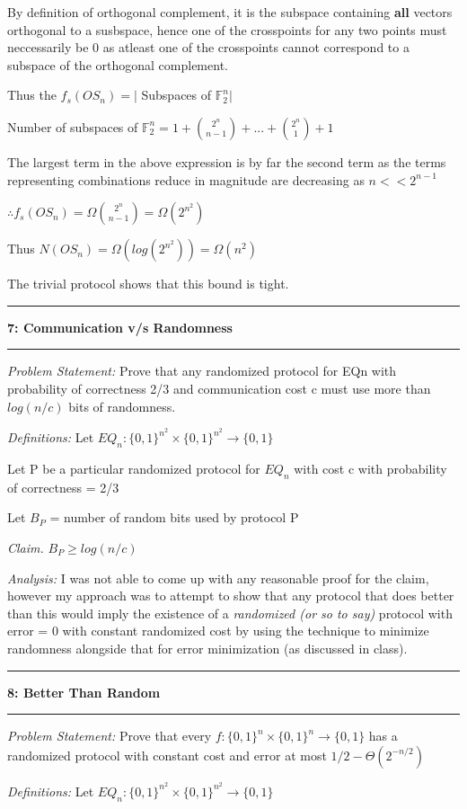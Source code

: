 \documentclass[11pt]{article}
\newcommand\question[2]{\vspace{.25in}\hrule\textbf{#1: #2}\vspace{.5em}\hrule\vspace{.10in}}
\newcommand\analysis{\vspace{.10in}\emph{Analysis: }\newline}
\newcommand\problem{\emph{Problem Statement:}\newline}
\newcommand\definitions{\emph{Definitions:}\newline}
\newcommand\claim{\emph{Claim.}\newline}
\begin{document}
By definition of orthogonal complement, it is the subspace containing \textbf{all} vectors orthogonal to a susbspace, hence one of the crosspoints for any two points must neccessarily be 0 as atleast one of the crosspoints cannot correspond to a subspace of the orthogonal complement. 

Thus the $f_s(OS_n) = \lvert$ Subspaces of $\mathbb{F}_2^n \rvert$

Number of subspaces of $\mathbb{F}_2^n = 1 + {2^n \choose n - 1} + ... + {2^n \choose 1} + 1$

The largest term in the above expression is by far the second term as the terms representing combinations reduce in magnitude are decreasing as $n << 2^{n-1}$

$\therefore f_s(OS_n) = \Omega{2^n \choose n - 1} = \Omega({2^{n^2}})$

Thus $N(OS_n) = \Omega(log(2^{n^2})) = \Omega(n^2)$

The trivial protocol shows that this bound is tight. 

\newpage

\question{7}{Communication v/s Randomness}

\problem
Prove that any randomized protocol for EQn with probability of correctness 2/3 and communication cost c must use more than $log(n/c)$ bits of randomness.

\definitions
Let $EQ_n: {\{0, 1\}}^{n^2} \times {\{0, 1\}}^{n^2} \to \{0, 1\}$

Let P be a particular randomized protocol for $EQ_n$ with cost c with probability of correctness = 2/3

Let $B_P$ = number of random bits used by protocol P 

\claim
$B_{P} \geq log(n/c)$

\analysis
I was not able to come up with any reasonable proof for the claim, however my approach was to attempt to show that any protocol that does better than this would imply the existence of a \emph{randomized (or so to say)} protocol with error = 0 with constant randomized cost by using the technique to minimize randomness alongside that for error minimization (as discussed in class). 

\newpage
\question{8}{Better Than Random}

\problem
Prove that every $f : {\{0, 1\}}^n \times {\{0, 1\}}^n \to \{0, 1\}$ has a randomized protocol with constant cost and error at most $1/2 - \Theta(2^{-n/2})$

\definitions
Let $EQ_n: {\{0, 1\}}^{n^2} \times {\{0, 1\}}^{n^2} \to \{0, 1\}$
\end{document}
